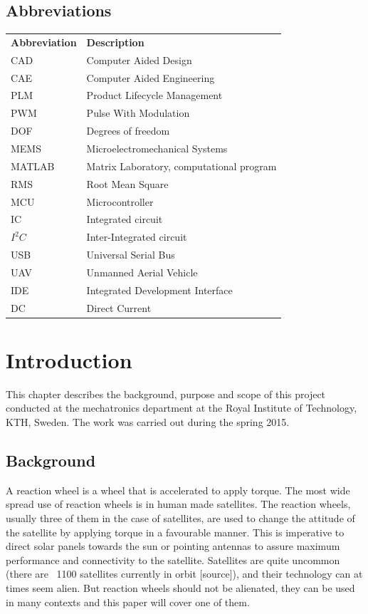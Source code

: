 \documentclass[a4paper,11pt]{kth-mag}
\begin{document}
\section*{Abbreviations}
\noindent{}\begin{tabular}{@{}p{2.5cm}l}
\textbf{Abbreviation} 	& \textbf{Description} \vspace{.5em} \\
CAD			& Computer Aided Design \\
CAE			& Computer Aided Engineering\\
PLM			& Product Lifecycle Management\\
PWM			& Pulse With Modulation\\
DOF			& Degrees of freedom\\
MEMS			& Microelectromechanical Systems \\
MATLAB		& Matrix Laboratory, computational program\\
RMS			& Root Mean Square\\
MCU			& Microcontroller\\
IC			& Integrated circuit\\
$I^2C$		& Inter-Integrated circuit\\
USB			& Universal Serial Bus \\
UAV			& Unmanned Aerial Vehicle\\
IDE 			& Integrated Development Interface \\
DC			& Direct Current
\end{tabular}
\cleardoublepage

\mainmatter
\pagestyle{newchap}

\chapter{Introduction}
This chapter describes the background, purpose and scope of this project conducted at the mechatronics department at the Royal Institute of Technology, KTH, Sweden. The work was carried out during the spring 2015.

\section{Background}
A reaction wheel is a wheel that is accelerated to apply torque. The most wide spread use of reaction wheels is in human made satellites. The  reaction wheels, usually three of them in the case of satellites, are used to change the attitude of the satellite by applying torque in a favourable manner. This is imperative to direct solar panels towards the sun or pointing antennas to assure maximum performance and connectivity to the satellite. Satellites are quite uncommon (there are ~1100 satellites currently in orbit [source]), and their technology can at times seem alien. But reaction wheels should not be alienated, they can be used in many contexts and this paper will cover one of them.  
\end{document}
